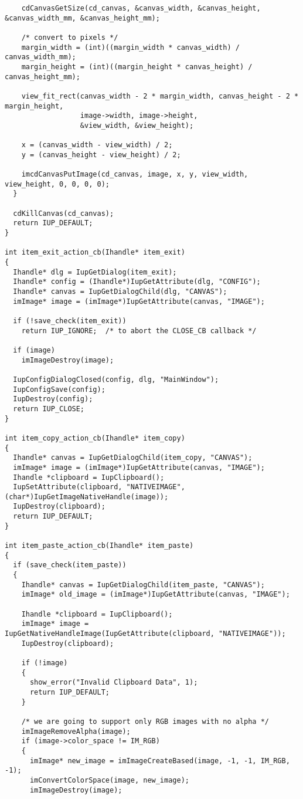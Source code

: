\documentclass{ctexart}
\begin{document}
\begin{lstlisting}
    cdCanvasGetSize(cd_canvas, &canvas_width, &canvas_height, &canvas_width_mm, &canvas_height_mm);

    /* convert to pixels */
    margin_width = (int)((margin_width * canvas_width) / canvas_width_mm);
    margin_height = (int)((margin_height * canvas_height) / canvas_height_mm);

    view_fit_rect(canvas_width - 2 * margin_width, canvas_height - 2 * margin_height, 
                  image->width, image->height, 
                  &view_width, &view_height);

    x = (canvas_width - view_width) / 2;
    y = (canvas_height - view_height) / 2;

    imcdCanvasPutImage(cd_canvas, image, x, y, view_width, view_height, 0, 0, 0, 0);
  }

  cdKillCanvas(cd_canvas);
  return IUP_DEFAULT;
}

int item_exit_action_cb(Ihandle* item_exit)
{
  Ihandle* dlg = IupGetDialog(item_exit);
  Ihandle* config = (Ihandle*)IupGetAttribute(dlg, "CONFIG");
  Ihandle* canvas = IupGetDialogChild(dlg, "CANVAS");
  imImage* image = (imImage*)IupGetAttribute(canvas, "IMAGE");

  if (!save_check(item_exit))
    return IUP_IGNORE;  /* to abort the CLOSE_CB callback */

  if (image)
    imImageDestroy(image);

  IupConfigDialogClosed(config, dlg, "MainWindow");
  IupConfigSave(config);
  IupDestroy(config);
  return IUP_CLOSE;
}

int item_copy_action_cb(Ihandle* item_copy) 
{
  Ihandle* canvas = IupGetDialogChild(item_copy, "CANVAS");
  imImage* image = (imImage*)IupGetAttribute(canvas, "IMAGE");
  Ihandle *clipboard = IupClipboard();
  IupSetAttribute(clipboard, "NATIVEIMAGE", (char*)IupGetImageNativeHandle(image));
  IupDestroy(clipboard);
  return IUP_DEFAULT;
}

int item_paste_action_cb(Ihandle* item_paste) 
{
  if (save_check(item_paste))
  {
    Ihandle* canvas = IupGetDialogChild(item_paste, "CANVAS");
    imImage* old_image = (imImage*)IupGetAttribute(canvas, "IMAGE");

    Ihandle *clipboard = IupClipboard();
    imImage* image = IupGetNativeHandleImage(IupGetAttribute(clipboard, "NATIVEIMAGE"));
    IupDestroy(clipboard);

    if (!image)
    {
      show_error("Invalid Clipboard Data", 1);
      return IUP_DEFAULT;
    }

    /* we are going to support only RGB images with no alpha */
    imImageRemoveAlpha(image);
    if (image->color_space != IM_RGB)
    {
      imImage* new_image = imImageCreateBased(image, -1, -1, IM_RGB, -1);
      imConvertColorSpace(image, new_image);
      imImageDestroy(image);


\end{lstlisting}
\end{document}
